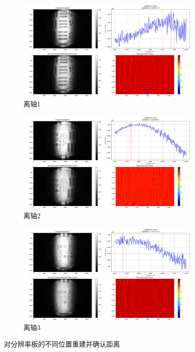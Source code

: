 \documentclass[a4paper,draft]{report} %
\begin{document}
\begin{figure}[H]
\centering
\begin{subfigure}{0.9\textwidth}
    \centering
    \includegraphics[width=\linewidth]{lizhou1分辨率板}
    \caption{离轴1}
    \label{Fig.sub.4}
\end{subfigure}

\begin{subfigure}{0.9\textwidth}
    \centering
    \includegraphics[width=\linewidth]{lizhou2分辨率板}
    \caption{离轴2}
    \label{Fig.sub.5}
\end{subfigure}

\begin{subfigure}{0.9\textwidth}
    \centering
    \includegraphics[width=\linewidth]{lizhou3分辨率板}
    \caption{离轴3}
    \label{Fig.sub.6}    
\end{subfigure}

\caption{对分辨率板的不同位置重建并确认距离}
\label{Fig.main2}
\end{figure}
\end{document}
